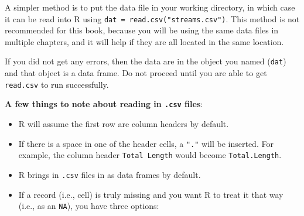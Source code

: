 \documentclass[]{book}
\providecommand{\tightlist}{%
  \setlength{\itemsep}{0pt}\setlength{\parskip}{0pt}}
\theoremstyle{definition}
\theoremstyle{definition}
\theoremstyle{definition}
\theoremstyle{remark}
\begin{document}
A simpler method is to put the data file in your working directory, in
which case it can be read into R using
\texttt{dat\ =\ read.csv("streams.csv")}. This method is not recommended
for this book, because you will be using the same data files in multiple
chapters, and it will help if they are all located in the same location.

If you did not get any errors, then the data are in the object you named
(\texttt{dat}) and that object is a data frame. Do not proceed until you
are able to get \texttt{read.csv} to run successfully.

\textbf{A few things to note about reading in \texttt{.csv} files}:

\begin{itemize}
\tightlist
\item
  R will assume the first row are column headers by default.
\item
  If there is a space in one of the header cells, a \texttt{"."} will be
  inserted. For example, the column header \texttt{Total\ Length} would
  become \texttt{Total.Length}.
\item
  R brings in \texttt{.csv} files in as data frames by default.
\item
  If a record (i.e., cell) is truly missing and you want R to treat it
  that way (i.e., as an \texttt{NA}), you have three options:


\end{itemize}
\end{document}
